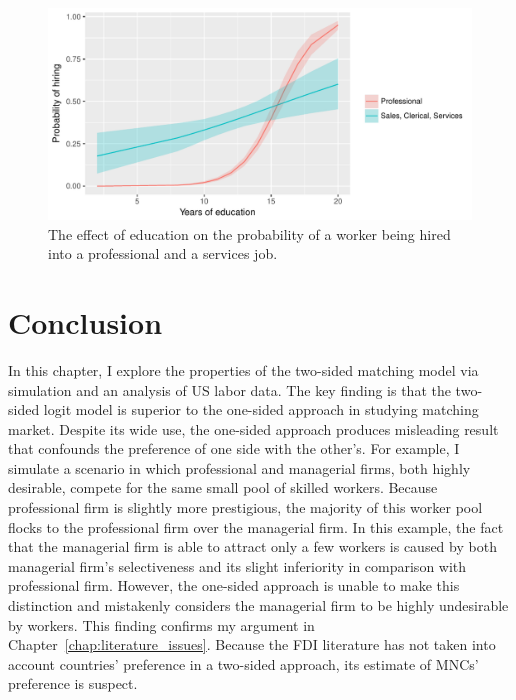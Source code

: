\begin{figure}[tbp]
  \centering \includegraphics[width=\textwidth,keepaspectratio]{../figure/labor_occ5_educ_effect_on_hiring}
  \caption[The effect of education on the probability of a worker being hired in
  the US labor market.]{The
    effect of education on the probability of a worker being hired into a professional
    and a services job.}
  \label{fig:labor_occ5_educ_effect_on_hiring}
\end{figure}

\section{Conclusion}

In this chapter, I explore the properties of the two-sided matching model via
simulation and an analysis of US labor data. The key finding is that the
two-sided logit model is superior to the one-sided approach in studying matching
market. Despite its wide use, the one-sided approach produces misleading result
that confounds the preference of one side with the other's. For example, I
simulate a scenario in which professional and managerial firms, both highly
desirable, compete for the same small pool of skilled workers. Because
professional firm is slightly more prestigious, the majority of this worker pool
flocks to the professional firm over the managerial firm. In this example, the
fact that the managerial firm is able to attract only a few workers is caused by
both managerial firm's selectiveness and its slight inferiority in comparison
with professional firm. However, the one-sided approach is unable to make this
distinction and mistakenly considers the managerial firm to be highly
undesirable by workers. This finding confirms my argument in
Chapter~\ref{chap:literature_issues}. Because the FDI literature has not taken
into account countries' preference in a two-sided approach, its estimate of
MNCs' preference is suspect.

